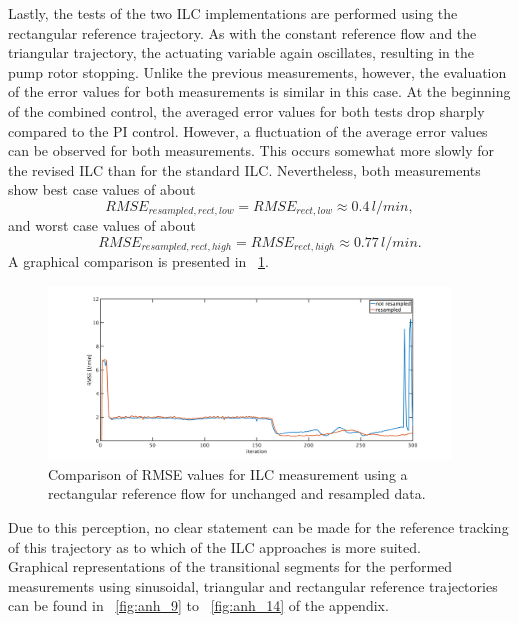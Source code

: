 Lastly, the tests of the two ILC implementations are performed using the rectangular reference trajectory.  As with the constant reference flow and the triangular trajectory, the actuating variable again oscillates, resulting in the pump rotor stopping.
Unlike the previous measurements, however, the evaluation of the error values for both measurements is similar in this case. At the beginning of the combined control, the averaged error values for both tests drop sharply compared to the PI control. However, a fluctuation of the average error values can be observed for both measurements. This occurs somewhat more slowly for the revised ILC than for the standard ILC. Nevertheless, both measurements show best case values of about
\begin{equation}
  RMSE_{resampled,rect,low}=RMSE_{rect,low}\approx0.4\,l/min,
\end{equation}
and worst case values of about
\begin{equation}
  RMSE_{resampled,rect,high}=RMSE_{rect,high}\approx0.77\,l/min.
\end{equation}
A graphical comparison is presented in \figurename~\ref{fig:RMSE_ilc_var_dist_comp_rect}.
\begin{figure}[ht!]
  \centering
  \includegraphics[width=0.95\textwidth]{images/chapt_5/ILC/RMSE_ilc_var_dist_comp_rect.pdf}
  \caption[Comparison of RMSE values for ILC measurement using a rectangular reference flow for unchanged and resampled data]{Comparison of RMSE values for ILC measurement using a rectangular reference flow for unchanged and resampled data.}
  \label{fig:RMSE_ilc_var_dist_comp_rect}
\end{figure}
Due to this perception, no clear statement can be made for the reference tracking of this trajectory as to which of the ILC approaches is more suited.
\\Graphical representations of the transitional segments for the performed measurements using sinusoidal, triangular and rectangular reference trajectories can be found in \figurename~\ref{fig:anh_9} to \figurename~\ref{fig:anh_14} of the appendix.

